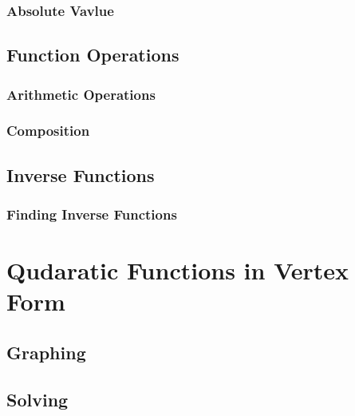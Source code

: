 \documentclass[]{book}
\begin{document}
\hypertarget{absolute-vavlue}{%
\subsubsection{Absolute Vavlue}\label{absolute-vavlue}}

\hypertarget{function-operations}{%
\subsection{Function Operations}\label{function-operations}}

\hypertarget{arithmetic-operations}{%
\subsubsection{Arithmetic Operations}\label{arithmetic-operations}}

\hypertarget{composition}{%
\subsubsection{Composition}\label{composition}}

\hypertarget{inverse-functions}{%
\subsection{Inverse Functions}\label{inverse-functions}}

\hypertarget{finding-inverse-functions}{%
\subsubsection{Finding Inverse Functions}\label{finding-inverse-functions}}

\hypertarget{qudaratic-functions-in-vertex-form}{%
\section{Qudaratic Functions in Vertex Form}\label{qudaratic-functions-in-vertex-form}}

\hypertarget{graphing}{%
\subsection{Graphing}\label{graphing}}

\hypertarget{solving}{%
\subsection{Solving}\label{solving}}
\end{document}
